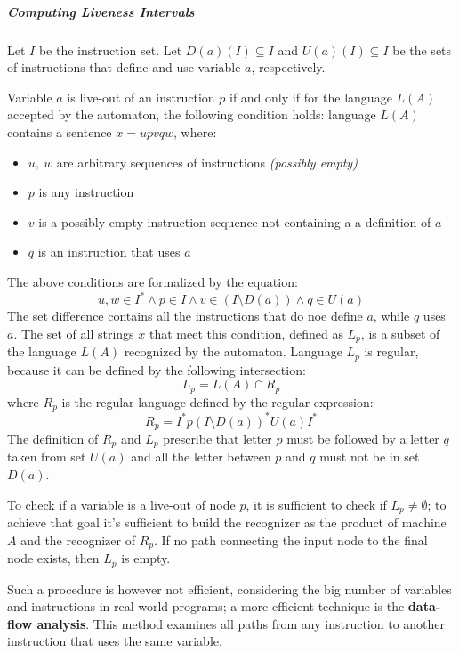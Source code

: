 \documentclass[english]{article}
\begin{document}
\subparagraph*{Computing Liveness Intervals}

Let \(I\) be the instruction set.
Let \(D(a)(I) \subseteq I\) and \(U(a)(I) \subseteq I\) be the sets of instructions that define and use variable \(a\), respectively.

Variable \(a\) is live-out of an instruction \(p\) if and only if for the language \(L(A)\) accepted by the automaton, the following condition holds:
language \(L(A)\) contains a sentence \(x = u p v q w\), where:
\begin{itemize}
  \item \(u, \ w\) are arbitrary sequences of instructions \textit{(possibly empty)}
  \item \(p\) is any instruction
  \item \(v\) is a possibly empty instruction sequence not containing a a definition of \(a\)
  \item \(q\) is an instruction that uses \(a\)
\end{itemize}

The above conditions are formalized by the equation:
\[ u, w \in I^\ast \land p \in I \land v \in \left( I \setminus D\left( a \right) \right) \land q \in U\left( a \right) \]
The set difference contains all the instructions that do noe define \(a\), while \(q\) uses \(a\).
The set of all strings \(x\) that meet this condition, defined as \(L_p\), is a subset of the language \(L(A)\) recognized by the automaton.
Language \(L_p\) is regular, because it can be defined by the following intersection:
\[ L_p = L(A) \cap R_p \]
where \(R_p\) is the regular language defined by the regular expression:
\[ R_p = I^\ast p \left( I \setminus D \left( a \right) \right)^\ast U \left( a \right) I^\ast \]
The definition of \(R_p\) and \(L_p\) prescribe that letter \(p\) must be followed by a letter \(q\) taken from set \(U\left( a \right)\)  and all the letter between \(p\) and \(q\) must not be in set \(D\left( a \right)\).

To check if a variable is a live-out of node \(p\), it is sufficient to check if \(L_p \neq \emptyset\);
to achieve that goal it's sufficient to build the recognizer as the product of machine \(A\) and the recognizer of \(R_p\).
If no path connecting the input node to the final node exists, then \(L_p\) is empty.

Such a procedure is however not efficient, considering the big number of variables and instructions in real world programs;
a more efficient technique is the \textbf{data-flow analysis}.
This method examines all paths from any instruction to another instruction that uses the same variable.
\end{document}
